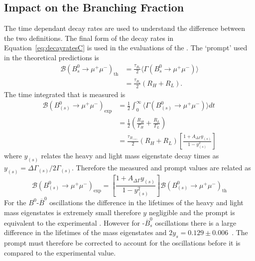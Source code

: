 \subsection{Impact on the Branching Fraction}
\label{sec:BFimpact}
The time dependant decay rates are used to understand the difference between the two \BF definitions. The final form of the decay rates in Equation~\ref{eq:decayratesC} is used in the evaluations of the \BFs. The `prompt' \BF used in the theoretical predictions is
\begin{align}
\mathcal{B}(B^{0}_{s} \to \mu^{+} \mu^{-})_{\mathrm{th}} &= \frac{\tau_{B_{s}}}{2} \langle \Gamma(B^{0}_{s} \to \mu^{+} \mu^{-}) \rangle \\
&=\frac{\tau_{B_{s}}}{2} (R_{H} + R_{L}).
\end{align}
The time integrated \BF that is measured is
\begin{align}
  \mathcal{B}(B^{0}_{(s)} \to \mu^{+}\mu^{-})_{\mathrm{exp}} &= \frac{1}{2} \int^{\infty}_0 \langle \Gamma (B^{0}_{(s)} \to \mu^{+}\mu^{-}) \rangle  dt \nonumber \\
&= \frac{1}{2} \left( \frac{R_{H}}{\Gamma_{H}} + \frac{R_{L}}{\Gamma_{L}} \right) \nonumber \\
&= \frac{\tau_{B_{(s)}}}{2}(R_{H} + R_{L}) \left[ \frac{1 + A_{\Delta\Gamma}y_{(s)}}{1 - y_{(s)}^{2}} \right]
\end{align}
where $y_{(s)}$ relates the heavy and light mass eigenstate decay times as $y_{(s)} = \Delta \Gamma_{(s)} / 2\Gamma_{(s)}$. Therefore the measured and prompt \BF values are related as
\begin{equation}
  \mathcal{B}(B^0_{(s)} \to \mu^+\mu^-)_{\mathrm{exp}} = \left[ \frac{1 + A_{\Delta\Gamma}y_{(s)}}{1 - y_{(s)}^{2}} \right] \mathcal{B}(B^0_{(s)} \to \mu^+ \mu^-)_{\mathrm{th}}
\end{equation}
For the $B^0$-$\overline{B}^0$ oscillations the difference in the lifetimes of the heavy and light mass eigenstates is extremely small therefore $y$ negligible and the prompt \BF is equivalent to the experimental \BF. However for \bs-$\overline{B}^0_s$ oscillations there is a large difference in the lifetimes of the mass eigenstates and $2y_s =0.129 \pm 0.006$~\cite{Amhis:2016xyh}. The prompt \BF must therefore be corrected to account for the oscillations before it is compared to the experimental value.
